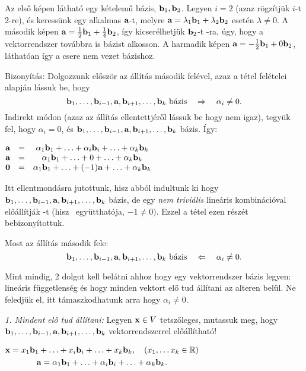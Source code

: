 \documentclass[a4paper,11.5pt]{article}
\begin{document}
	{\centering Az első képen látható egy kételemű bázis, $\textbf{b}_1,\textbf{b}_2$. Legyen $i=2$ (azaz rögzítjük $i$-t 2-re), és keressünk egy alkalmas $\textbf{a}$-t, melyre $\textbf{a}=\lambda_1\textbf{b}_1+\lambda_2\textbf{b}_2$ esetén $\lambda \not=0$. A második képen $\textbf{a}=\frac{1}{2}\textbf{b}_1+\frac{1}{4}\textbf{b}_2$, így kicserélhetjük $\textbf{b}_2$-t \a-ra, úgy, hogy a vektorrendszer továbbra is bázist alkosson. A harmadik képen $\textbf{a}=-\frac{1}{2}\textbf{b}_1+0\textbf{b}_2$, láthatóan így a csere nem vezet bázishoz. \par}	
	
	Bizonyítás: Dolgozzunk először az állítás második felével, azaz a tétel felételei alapján lássuk be, hogy \[\textbf{b}_1,\ldots,\textbf{b}_{i-1},\textbf{a},\textbf{b}_{i+1},\ldots,\textbf{b}_k \text{ bázis} \quad\Rightarrow \quad \alpha_i\not=0.\]
	Indirekt módon (azaz az állítás ellentettjéről lássuk be hogy nem igaz), tegyük fel, hogy $\alpha_i=0$, és $\textbf{b}_1,\ldots,\textbf{b}_{i-1},\textbf{a},\textbf{b}_{i+1},\ldots,\textbf{b}_k$ bázis. Így:
	
	\begin{center}
		$\begin{matrix}
			\textbf{a}&=&\alpha_1\textbf{b}_1+\ldots+\alpha_i\textbf{b}_i+\ldots+\alpha_k\textbf{b}_k\\
			\textbf{a}&=&\alpha_1\textbf{b}_1+\ldots+0+\ldots+\alpha_k\textbf{b}_k\\
			\textbf{0}&=&\alpha_1\textbf{b}_1+\ldots+(-1)\textbf{a}+\ldots+\alpha_k\textbf{b}_k
		\end{matrix}$
	\end{center}
	
	Itt ellentmondásra jutottunk, hisz abból indultunk ki hogy $\textbf{b}_1,\ldots,\textbf{b}_{i-1},\textbf{a},\textbf{b}_{i+1},\ldots,\textbf{b}_k$ bázis, de egy \emph{nem triviális} lineáris kombinációval előállítják \0-t (hisz \a\  együtthatója, $-1\not=0)$. Ezzel a tétel ezen részét bebizonyítottuk.
	
	\medskip
	Most az állítás második fele:
	\[\textbf{b}_1,\ldots,\textbf{b}_{i-1},\textbf{a},\textbf{b}_{i+1},\ldots,\textbf{b}_k \text{ bázis} \quad\Leftarrow \quad \alpha_i\not=0.\]
	
	Mint mindig, 2 dolgot kell belátni ahhoz hogy egy vektorrendszer bázis legyen: lineáris függetlenség és hogy minden vektort elő tud állítani az alteren belül. Ne feledjük el, itt támaszkodhatunk arra hogy $\alpha_i\not=0$.
	
	\smallskip
	\emph{1. Mindent elő tud állítani:} Legyen $\textbf{x} \in V$ tetszőleges, mutassuk meg, hogy $\textbf{b}_1,\ldots,\textbf{b}_{i-1},\textbf{a},\textbf{b}_{i+1},\ldots,\textbf{b}_k$ vektorrendszerrel előállítható!
	
	\begin{center}
		$\begin{gathered}
			\textbf{x}=x_1\textbf{b}_1+\ldots+x_i\textbf{b}_i+\ldots+ x_k\textbf{b}_k,\quad (x_1,\ldots x_k\in\mathbb{R})\\
			\textbf{a} = \alpha_1\textbf{b}_1+\ldots+\alpha_i\textbf{b}_i+\ldots+\alpha_k\textbf{b}_k.\\
		\end{gathered}$
	\end{center}
	
\end{document}
